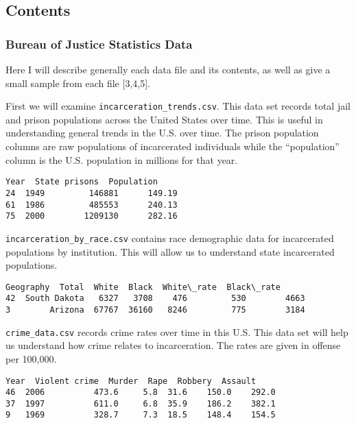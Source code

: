 \documentclass[11pt]{article}
\begin{document}
    \hypertarget{contents}{%
\subsection{Contents}\label{contents}}

\hypertarget{bureau-of-justice-statistics-data}{%
\subsubsection{Bureau of Justice Statistics
Data}\label{bureau-of-justice-statistics-data}}

Here I will describe generally each data file and its contents, as well
as give a small sample from each file {[}3,4,5{]}.

    First we will examine \texttt{incarceration\_trends.csv}. This data set
records total jail and prison populations across the United States over
time. This is useful in understanding general trends in the U.S. over
time. The prison population columns are raw populations of incarcerated
individuals while the ``population'' column is the U.S. population in
millions for that year.

    \begin{Verbatim}[commandchars=\\\{\}]
    Year  State prisons  Population
24  1949         146881      149.19
61  1986         485553      240.13
75  2000        1209130      282.16

    \end{Verbatim}

    \texttt{incarceration\_by\_race.csv} contains race demographic data for
incarcerated populations by institution. This will allow us to
understand state incarcerated populations.

    \begin{Verbatim}[commandchars=\\\{\}]
       Geography  Total  White  Black  White\_rate  Black\_rate
42  South Dakota   6327   3708    476         530        4663
3        Arizona  67767  36160   8246         775        3184

    \end{Verbatim}

    \texttt{crime\_data.csv} records crime rates over time in this U.S. This
data set will help us understand how crime relates to incarceration. The
rates are given in offense per 100,000.

    \begin{Verbatim}[commandchars=\\\{\}]
    Year  Violent crime  Murder  Rape  Robbery  Assault
46  2006          473.6     5.8  31.6    150.0    292.0
37  1997          611.0     6.8  35.9    186.2    382.1
9   1969          328.7     7.3  18.5    148.4    154.5

    \end{Verbatim}
\end{document}
